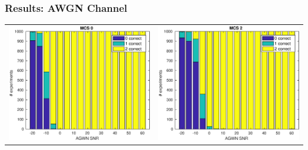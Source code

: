 \documentclass[accentcolor=tud8b,colorbacktitle]{tudbeamer}
\begin{document}
\begin{frame}
\frametitle{Results: AWGN Channel}
	\centering
	\vspace{-0.3cm}
	\begin{tabular}{cc}
		\includegraphics[height=0.52\textheight]{../../gfx/plots/awgn-mcs0} &
		\includegraphics[height=0.52\textheight]{../../gfx/plots/awgn-mcs2} \\

\end{tabular}
\end{frame}
\end{document}
